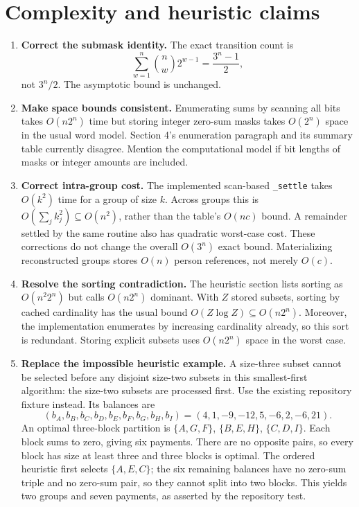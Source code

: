 \documentclass[11pt]{article}
\begin{document}
\section{Complexity and heuristic claims}

\begin{enumerate}
\item \textbf{Correct the submask identity.} The exact transition count is
\[
 \sum_{w=1}^{n}\binom nw2^{w-1}=\frac{3^n-1}{2},
\]
not $3^n/2$. The asymptotic bound is unchanged.

\item \textbf{Make space bounds consistent.} Enumerating sums by scanning
all bits takes $O(n2^n)$ time but storing integer zero-sum masks takes
$O(2^n)$ space in the usual word model. Section 4's enumeration paragraph
and its summary table currently disagree. Mention the computational model
if bit lengths of masks or integer amounts are included.

\item \textbf{Correct intra-group cost.} The implemented scan-based
\texttt{\_settle} takes $O(k^2)$ time for a group of size $k$.
Across groups this is $O(\sum_j k_j^2)\subseteq O(n^2)$, rather than
the table's $O(nc)$ bound. A remainder settled by the same routine also
has quadratic worst-case cost. These corrections do not change the
overall $O(3^n)$ exact bound. Materializing reconstructed groups stores
$O(n)$ person references, not merely $O(c)$.

\item \textbf{Resolve the sorting contradiction.} The heuristic section
lists sorting as $O(n^2 2^n)$ but calls $O(n2^n)$ dominant. With $Z$
stored subsets, sorting by cached cardinality has the usual bound
$O(Z\log Z)\subseteq O(n2^n)$. Moreover, the implementation enumerates
by increasing cardinality already, so this sort is redundant. Storing
explicit subsets uses $O(n2^n)$ space in the worst case.

\item \textbf{Replace the impossible heuristic example.} A size-three
subset cannot be selected before any disjoint size-two subsets in this
smallest-first algorithm: the size-two subsets are processed first.
Use the existing repository fixture instead. Its balances are
\[
 (b_A,b_B,b_C,b_D,b_E,b_F,b_G,b_H,b_I)
 =(4,1,-9,-12,5,-6,2,-6,21).
\]
An optimal three-block partition is
$\{A,G,F\}$, $\{B,E,H\}$, $\{C,D,I\}$.
Each block sums to zero, giving six payments. There are no opposite
pairs, so every block has size at least three and three blocks is optimal.
The ordered heuristic first selects $\{A,E,C\}$; the six remaining
balances have no zero-sum triple and no zero-sum pair, so they cannot
split into two blocks. This yields two groups and seven payments,
as asserted by the repository test.


\end{enumerate}
\end{document}
